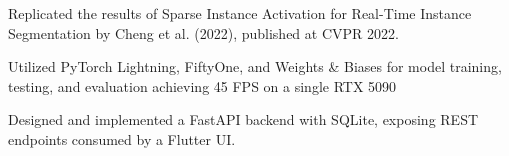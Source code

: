 \documentclass[]{resume-template}
\begin{document}
\begin{minipage}[t]{0.66\textwidth}
  \label{subsec:sparseinst}
  \begin{tightemize}
  \item Replicated the results of Sparse Instance Activation for
    Real-Time Instance Segmentation by Cheng et al. (2022), published
    at CVPR 2022.
  \item Utilized PyTorch Lightning, FiftyOne, and Weights \& Biases
    for model training, testing, and evaluation achieving 45 FPS on a single RTX 5090

  \end{tightemize}
  \label{subsec: Bookie}
  \begin{tightemize}
    \item Designed and implemented a FastAPI backend with SQLite, exposing REST endpoints consumed by a Flutter UI.
  \end{tightemize}


\end{minipage}
\end{document}
